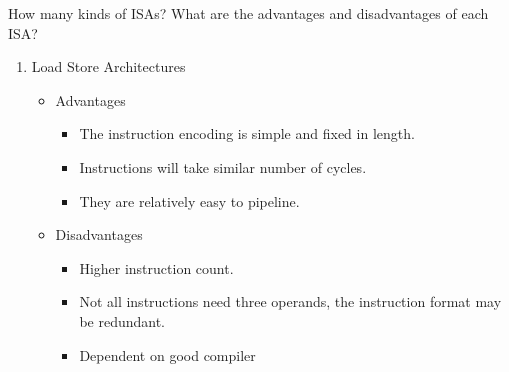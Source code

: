 \begin{exercise}[]{How many kinds of ISAs? What are the advantages and disadvantages of each ISA?
    }
\begin{solution}
\begin{enumerate}
    \item Load Store Architectures
    \begin{itemize}
        \item Advantages
        \begin{itemize}
            \item The instruction encoding is simple and fixed in length.
            \item Instructions will take similar number of cycles.
            \item They are relatively easy to pipeline.
        \end{itemize}
        
        \item Disadvantages
        \begin{itemize}
            \item Higher instruction count.
            \item Not all instructions need three operands, the instruction format may be redundant.
            \item Dependent on good compiler
        \end{itemize}
    \end{itemize}

\end{enumerate}



  \end{solution}
  \label{ex2}
\end{exercise}    


